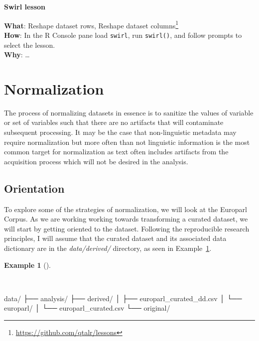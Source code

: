 \documentclass[
  letterpaper,
  DIV=11,
  numbers=noendperiod]{scrreport}
\newenvironment{Shaded}{\begin{snugshade}}{\end{snugshade}}
\newcommand{\ExtensionTok}[1]{\textcolor[rgb]{0.00,0.00,0.00}{#1}}
\newcommand{\NormalTok}[1]{\textcolor[rgb]{0.00,0.00,0.00}{#1}}
\theoremstyle{definition}
\newtheorem{example}{Example}[chapter]
\theoremstyle{remark}
\DeclareRobustCommand{\href}[2]{#2\footnote{\url{#1}}}
\begin{document}
\begin{tcolorbox}[enhanced jigsaw, leftrule=.75mm, bottomrule=.15mm, opacityback=0, breakable, left=2mm, colback=white, toprule=.15mm, arc=.35mm, rightrule=.15mm]

\textbf{ Swirl lesson}

\textbf{What}: \href{https://github.com/qtalr/lessons}{Reshape dataset
rows, Reshape dataset columns}\\
\textbf{How}: In the R Console pane load \texttt{swirl}, run
\texttt{swirl()}, and follow prompts to select the lesson.\\
\textbf{Why}: \ldots{} 

\end{tcolorbox}

\hypertarget{sec-td-normalization}{%
\section{Normalization}\label{sec-td-normalization}}

The process of normalizing datasets in essence is to sanitize the values
of variable or set of variables such that there are no artifacts that
will contaminate subsequent processing. It may be the case that
non-linguistic metadata may require normalization but more often than
not linguistic information is the most common target for normalization
as text often includes artifacts from the acquisition process which will
not be desired in the analysis.

\hypertarget{sec-td-normalization-orientation}{%
\subsection{Orientation}\label{sec-td-normalization-orientation}}

To explore some of the strategies of normalization, we will look at the
Europarl Corpus. As we are working working towards transforming a
curated dataset, we will start by getting oriented to the dataset.
Following the reproducible research principles, I will assume that the
curated dataset and its associated data dictionary are in the
\emph{data/derived/} directory, as seen in
Example~\ref{exm-td-europarl-curated-structure}.

\begin{example}[]\protect\hypertarget{exm-td-europarl-curated-structure}{}\label{exm-td-europarl-curated-structure}

~

\begin{Shaded}
\begin{Highlighting}[]
\ExtensionTok{data/}
\ExtensionTok{├──}\NormalTok{ analysis/}
\ExtensionTok{├──}\NormalTok{ derived/}
\ExtensionTok{│}\NormalTok{   ├── europarl\_curated\_dd.csv}
\ExtensionTok{│}\NormalTok{   └── europarl/}
\ExtensionTok{│}\NormalTok{       └── europarl\_curated.csv}
\ExtensionTok{└──}\NormalTok{ original/}
\end{Highlighting}
\end{Shaded}

\end{example}
\end{document}
